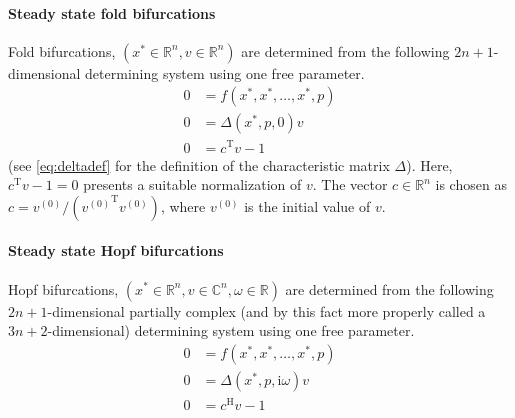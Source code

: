 \documentclass[10pt]{scrartcl}
\renewcommand{\i}{\mathrm{i}}
\newcommand{\T}{\mathrm{T}}
\renewcommand{\H}{\mathrm{H}}
\newcommand{\RR}{\mathbb{R}}
\newcommand{\CC}{\mathbb{C}}
\begin{document}
{\paragraph{Steady state fold bifurcations}
Fold bifurcations, $(x^*\in\RR^n,v\in\RR^n)$ are determined 
from the following
$2n+1$-dimensional determining system using one free
parameter.
\begin{equation}\label{determ_fold}
\begin{aligned}
0&=f(x^*,x^*,\ldots,x^*,{p}) \\
0&=\Delta(x^*,{p},0)v\\
0&=c^\T v-1
\end{aligned}
\end{equation}
(see \eqref{eq:deltadef} for the definition of the characteristic
matrix $\Delta$). Here, $c^\T v-1=0$ presents a suitable normalization
of $v$.  The vector $c\in\RR^n$ is chosen as $c=v^{(0)}/({v^{(0)}}^\T
v^{(0)})$, where $v^{(0)}$ is the initial value of $v$.

\paragraph{Steady state Hopf bifurcations}
Hopf bifurcations, $(x^*\in\RR^n,v\in\CC^n,\omega\in\RR)$ are
determined from the following $2n+1$-dimensional partially complex
(and by this fact more properly called a $3n+2$-dimensional)
determining system using one free parameter.
\begin{equation}\label{determ_hopf}
\begin{aligned}
0&=f(x^*,x^*,\ldots,x^*,{p})\\
0&=\Delta(x^*,{p},\i\omega)v\\
0&=c^\H v-1\\
\end{aligned}
\end{equation}

}
\end{document}
